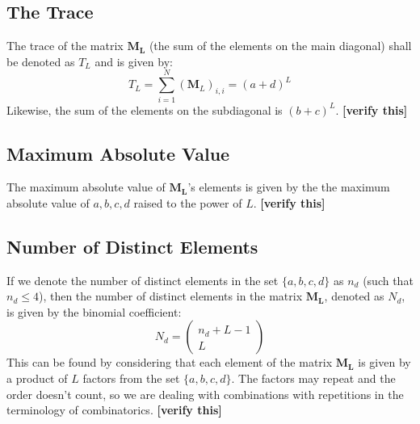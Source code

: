 \subsection{The Trace}
The trace of the matrix $\mathbf{M_L}$ (the sum of the elements on the main diagonal) shall be denoted as $T_L$ and is given by:
\begin{equation}
 T_L = \sum_{i=1}^N (\mathbf{M}_L)_{i,i} = (a+d)^L
\end{equation}
Likewise, the sum of the elements on the subdiagonal is $(b+c)^L$. \textbf{[verify this]}

\subsection{Maximum Absolute Value}
The maximum absolute value of $\mathbf{M_L}$'s elements is given by the the maximum absolute value of $a, b, c, d$ raised to the power of $L$. \textbf{[verify this]}

\subsection{Number of Distinct Elements}
If we denote the number of distinct elements in the set $\{a, b, c, d\}$ as $n_d$ (such that $n_d \leq 4$), then the number of distinct elements in the matrix $\mathbf{M_L}$, denoted as $N_d$, is given by the binomial coefficient:
\begin{equation}
 N_d = 
 \begin{pmatrix}
  n_d+L-1 \\
  L
 \end{pmatrix}
\end{equation}
This can be found by considering that each element of the matrix $\mathbf{M_L}$ is given by a product of $L$ factors from the set $\{a, b, c, d\}$. The factors may repeat and the order doesn't count, so we are dealing with combinations with repetitions in the terminology of combinatorics. \textbf{[verify this]}

